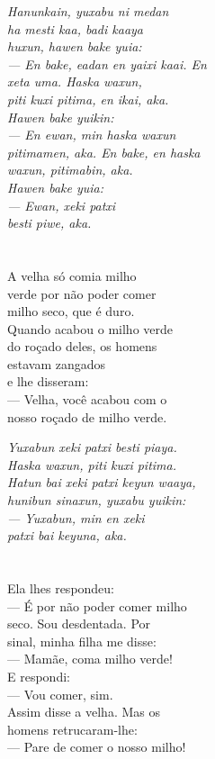 \textit{Hanunkain, yuxabu ni medan\\
ha mesti kaa, badi kaaya\\
huxun, hawen bake yuia:\\
--- En bake, eadan en yaixi kaai. En\\
xeta uma. Haska waxun,\\
piti kuxi pitima, en ikai, aka.\\
Hawen bake yuikin:\\
--- En ewan, min haska waxun\\
pitimamen, aka. En bake, en haska\\
waxun, pitimabin, aka.\\
Hawen bake yuia:\\
--- Ewan, xeki patxi\\
besti piwe, aka.}

\chapter{}

A velha só comia milho\\
verde por não poder comer\\
milho seco, que é duro.\\
Quando acabou o milho verde\\
do roçado deles, os homens\\
estavam zangados\\
e lhe disseram:\\
--- Velha, você acabou com o\\
nosso roçado de milho verde.

\textit{Yuxabun xeki patxi besti piaya.\\
Haska waxun, piti kuxi pitima.\\
Hatun bai xeki patxi keyun waaya,\\
hunibun sinaxun, yuxabu yuikin:\\
--- Yuxabun, min en xeki\\
patxi bai keyuna, aka.}


\chapter{}

Ela lhes respondeu:\\
--- É por não poder comer milho\\
seco. Sou desdentada. Por\\
sinal, minha filha me disse:\\
--- Mamãe, coma milho verde!\\
E respondi:\\
--- Vou comer, sim.\\
Assim disse a velha. Mas os\\
homens retrucaram-lhe:\\
--- Pare de comer o nosso milho!

